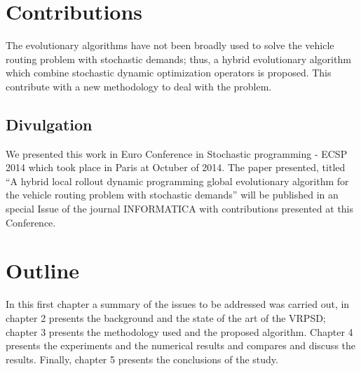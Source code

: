\section{Contributions}

The evolutionary algorithms have not been broadly used to solve the vehicle routing problem with stochastic demands; thus, a hybrid evolutionary algorithm which combine stochastic dynamic optimization operators is proposed. This contribute with a new methodology to deal with the problem.

\subsection{Divulgation}


We presented this work in Euro Conference in Stochastic programming - ECSP 2014 which took place in Paris at Octuber of 2014. The  paper presented, titled ``A hybrid local rollout dynamic programming global evolutionary algorithm for the vehicle routing problem with stochastic demands'' will be published in an special Issue of the journal INFORMATICA with contributions presented  at this Conference.

\section{Outline}

In this first chapter a summary of the issues to be addressed was carried out, in chapter 2 presents the background and the state of the art of the VRPSD; chapter 3 presents the methodology used and the proposed algorithm. Chapter 4 presents the experiments and the numerical results and compares and discuss the results. Finally, chapter 5 presents the conclusions of the study.

